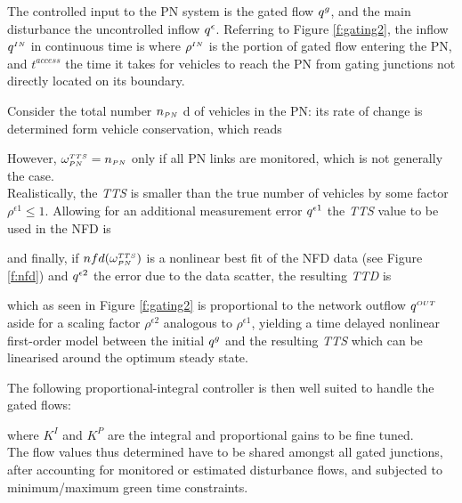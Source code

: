 The controlled input to the PN system is the gated flow $q^{g}$, and the main disturbance
the uncontrolled inflow $q^{\epsilon}$. Referring to Figure \ref{f:gating2}, the inflow $q^{\scriptscriptstyle{IN}}$ in continuous time is 
where $\rho^{\scriptscriptstyle{IN}}$ is the portion of gated flow entering the PN, and $t^{access}$ the time it takes for vehicles to reach the PN from gating junctions not directly located on its boundary.

Consider the total number $n_{\scriptscriptstyle{PN}}$ d of vehicles in the PN: its rate of change is determined
form vehicle conservation, which reads

However, $\omega_{\scriptscriptstyle{PN}}^{\scriptscriptstyle{TTS}} = n_{\scriptscriptstyle{PN}} $ only if all PN links are monitored, which is not generally the case.\\
Realistically, the \emph{TTS} is smaller than the true number of vehicles by some factor $\rho^{\epsilon 1} \leqslant 1$.
Allowing for an additional measurement error $q^{\epsilon 1}$ the \emph{TTS} value to be used in the NFD is


and finally, if $nfd( \omega_{\scriptscriptstyle{PN}}^{\scriptscriptstyle{TTS}} )$ is a nonlinear best fit of the NFD data (see Figure \ref{f:nfd}) and $q^{\epsilon 2}$ the error due to the data scatter, the resulting \emph{TTD} is


which as seen in Figure \ref{f:gating2} is proportional to the network outflow $q^{\scriptscriptstyle{OUT}}$ aside for a scaling factor $\rho^{\epsilon 2}$ analogous to $\rho^{\epsilon 1}$, yielding a time delayed nonlinear first-order model between the initial $q^{g}$ and the resulting \emph{TTS} which can be linearised around the optimum steady state.

The following proportional-integral controller is then well suited to handle the gated flows:


where $K^{I}$ and $K^{P}$ are the integral and proportional gains to be fine tuned.\\
The flow values thus determined have to be shared amongst all gated junctions, after accounting for monitored or estimated disturbance flows, and subjected to minimum/maximum green time constraints.

